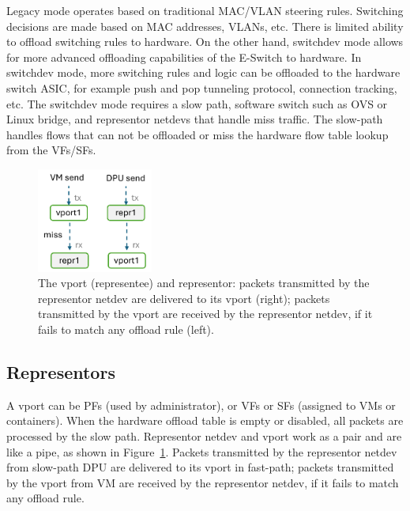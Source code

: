 \documentclass[letterpaper]{article}
\begin{document}
Legacy mode operates based on traditional MAC/VLAN steering rules. Switching
decisions are made based on MAC addresses, VLANs, etc. There is limited ability
to offload switching rules to hardware.
On the other hand, switchdev mode allows for more advanced offloading
capabilities of the E-Switch to hardware. In switchdev mode, more switching
rules and logic can be offloaded to the hardware switch ASIC, for example
push and pop tunneling protocol, connection tracking, etc.
The switchdev mode requires a slow path, software switch such as OVS or
Linux bridge, and representor netdevs that handle miss traffic.
The slow-path handles flows that can not be offloaded or miss the hardware
flow table lookup from the VFs/SFs.
\begin{figure}[t!]
\includegraphics[width=1.5in]{pipe.pdf}
\centering
\caption{The vport (representee) and representor: packets transmitted by the representor 
netdev are delivered to its vport (right); packets transmitted by the vport are
received by the representor netdev, if it fails to match any offload rule (left).}
\label{fig:pipe}
\end{figure}

\subsection{Representors}
A vport can be PFs (used by administrator), or VFs or SFs (assigned to VMs
or containers). When the hardware offload table is empty or disabled, all packets are 
processed by the slow path. Representor netdev and vport work as a pair and are like a
pipe, as shown in Figure~\ref{fig:pipe}. Packets transmitted by the representor
netdev from slow-path DPU are delivered to its vport in fast-path;
packets transmitted by the vport from VM are received by the representor netdev,
if it fails to match any offload rule.
\end{document}
